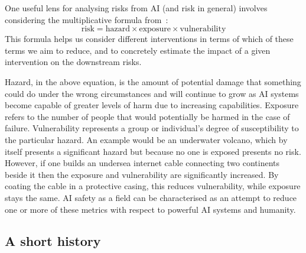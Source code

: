 One useful lens for analysing risks from AI (and risk in general) involves considering the multiplicative formula from~\citet{hendrycks_2023_overview}:
\[\text{risk} = \text{hazard} \times \text{exposure} \times \text{vulnerability}\]
This formula helps us consider different interventions in terms of which of these terms we aim to reduce, and to concretely estimate the impact of a given intervention on the downstream risks.

Hazard, in the above equation, is the amount of potential damage that something could do under the wrong circumstances and will continue to grow as AI systems become capable of greater levels of harm due to increasing capabilities. Exposure refers to the number of people that would potentially be harmed in the case of failure. Vulnerability represents a group or individual's degree of susceptibility to the particular hazard. An example would be an underwater volcano, which by itself presents a significant hazard but because no one is exposed presents no risk. However, if one builds an undersea internet cable connecting two continents beside it then the exposure and vulnerability are significantly increased. By coating the cable in a protective casing, this reduces vulnerability, while exposure stays the same. AI safety as a field can be characterised as an attempt to reduce one or more of these metrics with respect to powerful AI systems and humanity.


\subsection{A short history}\label{subsec:history}

